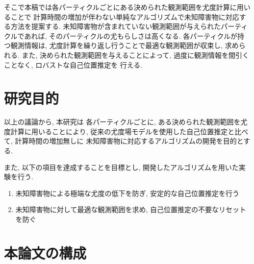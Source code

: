 そこで本稿では各パーティクルごとにある決められた観測範囲を尤度計算に用いることで
計算時間の増加が伴わない単純なアルゴリズムで未知障害物に対応する方法を提案する. 
未知障害物が含まれていない観測範囲が与えられたパーティクルであれば, 
そのパーティクルの尤もらしさは高くなる. 
各パーティクルが持つ観測情報は, 尤度計算を繰り返し行うことで最適な観測範囲が収束し, 求められる. 
また, 決められた観測範囲を与えることによって, 過度に観測情報を間引くことなく, ロバストな自己位置推定を
行える. 

\section{研究目的}
以上の議論から, 本研究は
各パーティクルごとに, ある決められた観測範囲を尤度計算に用いることにより, 
従来の尤度場モデルを使用した自己位置推定と比べて, 計算時間の増加無しに
未知障害物に対応するアルゴリズムの開発を目的とする. 

また, 以下の項目を達成することを目標とし, 開発したアルゴリズムを用いた実験を行う. 

\begin{enumerate}
  \item 未知障害物による極端な尤度の低下を防ぎ, 安定的な自己位置推定を行う
  \item 未知障害物に対して最適な観測範囲を求め, 自己位置推定の不要なリセットを防ぐ
\end{enumerate}

\section{本論文の構成}
